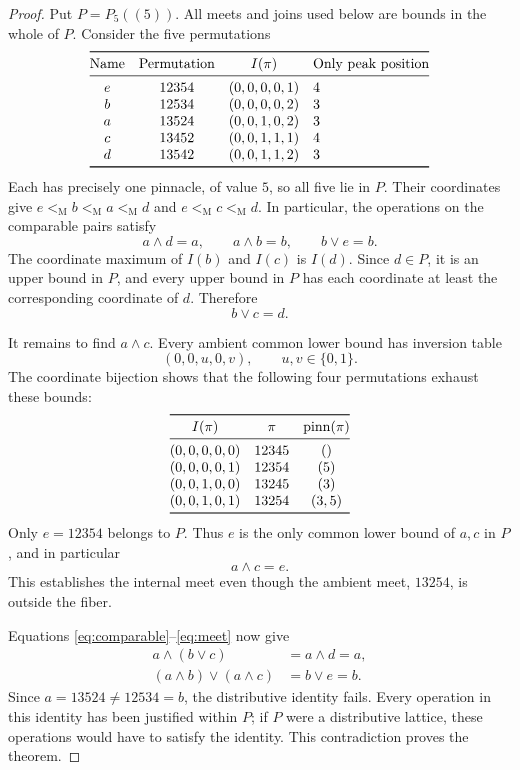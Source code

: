 \documentclass[11pt]{article}
\newcommand{\pinn}{\operatorname{pinn}}
\begin{document}
\begin{proof}
Put $P=P_5((5))$. All meets and joins used below are bounds in the
whole of $P$. Consider the five permutations
\[
\begin{array}{@{}cccl@{}}
\toprule
\text{Name}&\text{Permutation}&I(\pi)&\text{Only peak position}\\
\midrule
e&12354&(0,0,0,0,1)&4\\
b&12534&(0,0,0,0,2)&3\\
a&13524&(0,0,1,0,2)&3\\
c&13452&(0,0,1,1,1)&4\\
d&13542&(0,0,1,1,2)&3\\
\bottomrule
\end{array}
\]
Each has precisely one pinnacle, of value $5$, so all five lie in $P$.
Their coordinates give $e<_{\mathrm M}b<_{\mathrm M}a<_{\mathrm M}d$
and $e<_{\mathrm M}c<_{\mathrm M}d$. In particular, the operations on
the comparable pairs satisfy
\begin{equation}\label{eq:comparable}
 a\wedge d=a,\qquad a\wedge b=b,\qquad b\vee e=b.
\end{equation}
The coordinate maximum of $I(b)$ and $I(c)$ is $I(d)$. Since $d\in P$,
it is an upper bound in $P$, and every upper bound in $P$ has each
coordinate at least the corresponding coordinate of $d$. Therefore
\begin{equation}\label{eq:join}
 b\vee c=d.
\end{equation}

It remains to find $a\wedge c$. Every ambient common lower bound has
inversion table
\[
 (0,0,u,0,v),\qquad u,v\in\{0,1\}.
\]
The coordinate bijection shows that the following four permutations
exhaust these bounds:
\[
\begin{array}{@{}ccc@{}}
\toprule
I(\pi)&\pi&\pinn(\pi)\\
\midrule
(0,0,0,0,0)&12345&()\\
(0,0,0,0,1)&12354&(5)\\
(0,0,1,0,0)&13245&(3)\\
(0,0,1,0,1)&13254&(3,5)\\
\bottomrule
\end{array}
\]
Only $e=12354$ belongs to $P$. Thus $e$ is the only common lower bound
of $a,c$ in $P$, and in particular
\begin{equation}\label{eq:meet}
 a\wedge c=e.
\end{equation}
This establishes the internal meet even though the ambient meet,
$13254$, is outside the fiber.

Equations \eqref{eq:comparable}--\eqref{eq:meet} now give
\begin{align*}
 a\wedge(b\vee c)&=a\wedge d=a,\\
 (a\wedge b)\vee(a\wedge c)&=b\vee e=b.
\end{align*}
Since $a=13524\ne12534=b$, the distributive identity fails. Every
operation in this identity has been justified within $P$; if $P$ were
a distributive lattice, these operations would have to satisfy the
identity. This contradiction proves the theorem.
\end{proof}
\end{document}
